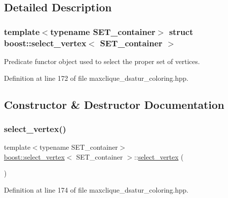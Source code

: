 \subsection{Detailed Description}
\subsubsection*{template$<$typename S\+E\+T\+\_\+container$>$\newline
struct boost\+::select\+\_\+vertex$<$ S\+E\+T\+\_\+container $>$}

Predicate functor object used to select the proper set of vertices. 

Definition at line 172 of file maxclique\+\_\+dsatur\+\_\+coloring.\+hpp.



\subsection{Constructor \& Destructor Documentation}
\mbox{\label{structboost_1_1select__vertex_a86c63ba4306db2ef6f4d3f4179bbb964}} 
\subsubsection{\texorpdfstring{select\+\_\+vertex()}{select\_vertex()}\hspace{0.1cm}{\footnotesize\ttfamily [1/3]}}
{\footnotesize\ttfamily template$<$typename S\+E\+T\+\_\+container$>$ \\
\hyperlink{structboost_1_1select__vertex}{boost\+::select\+\_\+vertex}$<$ S\+E\+T\+\_\+container $>$\+::\hyperlink{structboost_1_1select__vertex}{select\+\_\+vertex} (\begin{DoxyParamCaption}{ }\end{DoxyParamCaption})\hspace{0.3cm}{\ttfamily [inline]}}



Definition at line 174 of file maxclique\+\_\+dsatur\+\_\+coloring.\+hpp.

\mbox{\label{structboost_1_1select__vertex_a89184c491c2e510c4aab5ab2603fbfe3}} 
